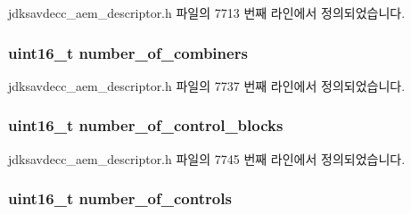 jdksavdecc\+\_\+aem\+\_\+descriptor.\+h 파일의 7713 번째 라인에서 정의되었습니다.

\subsubsection[{\texorpdfstring{number\+\_\+of\+\_\+combiners}{number_of_combiners}}]{\setlength{\rightskip}{0pt plus 5cm}uint16\+\_\+t number\+\_\+of\+\_\+combiners}\hypertarget{structjdksavdecc__descriptor__audio__unit_afbc32f9432e80e58a019b1be2388cf66}{}\label{structjdksavdecc__descriptor__audio__unit_afbc32f9432e80e58a019b1be2388cf66}


jdksavdecc\+\_\+aem\+\_\+descriptor.\+h 파일의 7737 번째 라인에서 정의되었습니다.

\subsubsection[{\texorpdfstring{number\+\_\+of\+\_\+control\+\_\+blocks}{number_of_control_blocks}}]{\setlength{\rightskip}{0pt plus 5cm}uint16\+\_\+t number\+\_\+of\+\_\+control\+\_\+blocks}\hypertarget{structjdksavdecc__descriptor__audio__unit_a564f961a8cec6e8f7b4bfdbbbfe650d4}{}\label{structjdksavdecc__descriptor__audio__unit_a564f961a8cec6e8f7b4bfdbbbfe650d4}


jdksavdecc\+\_\+aem\+\_\+descriptor.\+h 파일의 7745 번째 라인에서 정의되었습니다.

\subsubsection[{\texorpdfstring{number\+\_\+of\+\_\+controls}{number_of_controls}}]{\setlength{\rightskip}{0pt plus 5cm}uint16\+\_\+t number\+\_\+of\+\_\+controls}\hypertarget{structjdksavdecc__descriptor__audio__unit_a0104bea638bdadf1a547c2b93813e22f}{}\label{structjdksavdecc__descriptor__audio__unit_a0104bea638bdadf1a547c2b93813e22f}



